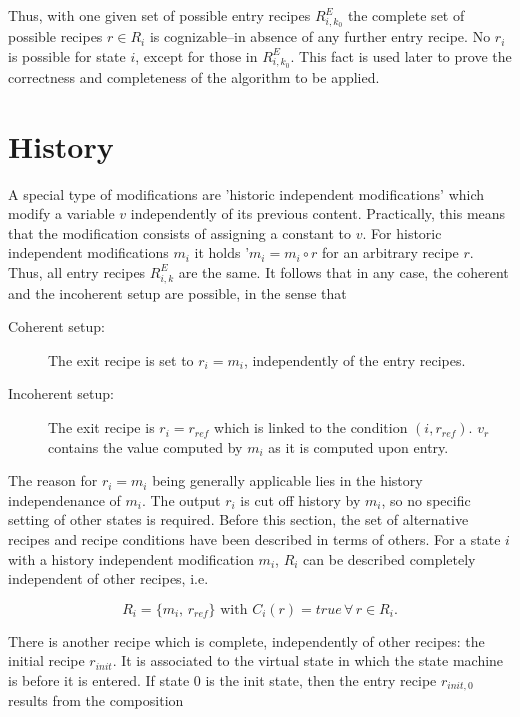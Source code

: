 \documentclass[12pt,a4paper]{scrartcl}
\begin{document}
Thus, with one given set of possible entry recipes $R^E_{i,k_0}$ the complete
set of possible recipes $r\in R_i$ is cognizable--in absence of any further
entry recipe. No $r_i$ is possible for state $i$, except for those in
$R^E_{i,k_0}$. This fact is used later to prove the correctness and
completeness of the algorithm to be applied. 

\section{History}

A special type of modifications are 'historic independent modifications' which
modify a variable $v$ independently of its previous content. Practically, this
means that the modification consists of assigning a constant to $v$. For
historic independent modifications $m_i$ it holds '$m_i=m_i\circ r$ for an
arbitrary recipe $r$.  Thus, all entry recipes $R^E_{i,k}$ are the same. It
follows that in any case, the coherent and the incoherent setup are possible,
in the sense that 

\begin{description}

    \item[Coherent setup:] The exit recipe is set to $r_i=m_i$, independently
        of the entry recipes.

    \item[Incoherent setup:] The exit recipe is $r_i=r_{ref}$ which is linked
        to the condition $(i,r_{ref})$.  $v_r$ contains the value computed by
        $m_i$ as it is computed upon entry.  

\end{description}

The reason for $r_i=m_i$ being generally applicable lies in the history
independenance of $m_i$. The output $r_i$ is cut off history by $m_i$, so no
specific setting of other states is required. Before this section, the set of
alternative recipes and recipe conditions have been described in terms of
others. For a state $i$ with a history independent modification $m_i$, $R_i$
can be described completely independent of other recipes, i.e.

\begin{equation} \label{eq:history-independent-completeness}
    R_i = \{ m_i,\, r_{ref} \}\,\,\mbox{with}\,\,C_i(r)=true\,\forall\,r\in R_i.
\end{equation}

There is another recipe which is complete, independently of other recipes: the
initial recipe $r_{init}$.  It is associated to the virtual state in which the
state machine is before it is entered. If state $0$ is the init state, then the
entry recipe $r_{init,0}$ results from the composition
\end{document}
